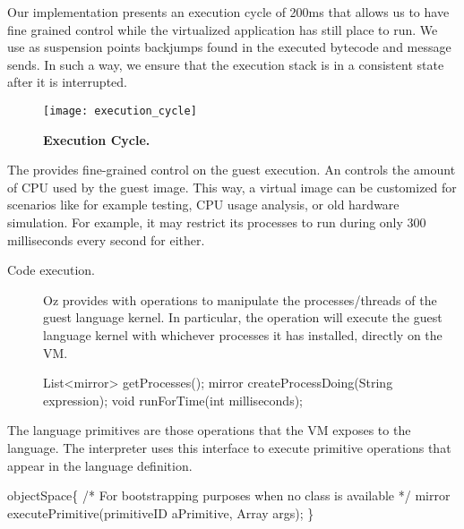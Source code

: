 Our implementation presents an execution cycle of 200ms that allows us to have fine grained control while the virtualized application has still place to run. We use as suspension points backjumps found in the executed bytecode and message sends. In such a way, we ensure that the execution stack is in a consistent state after it is interrupted.

\begin{figure}[ht]
\center
\texttt{[image: execution\_cycle]}
\caption{\textbf{Execution Cycle.} \label{fig:execution_cycle}}
\end{figure}

The \objectspace provides fine-grained control on the guest execution. An \objectspace controls the amount of CPU used by the guest image. This way, a virtual image can be customized for scenarios like for example testing, CPU usage analysis, or old hardware simulation. For example, it may restrict its processes to run during only 300 milliseconds every second for either.

\begin{description}
\item[Code execution.] Oz provides with operations to manipulate the processes/threads of the guest language kernel. In particular, the  operation will execute the guest language kernel with whichever processes it has installed, directly on the VM.
\begin{code}
List<mirror> getProcesses();
mirror createProcessDoing(String expression);
void runForTime(int milliseconds);
\end{code}
\end{description}

The language primitives are those operations that the VM exposes to the language. The interpreter uses this interface to execute primitive operations that appear in the language definition.

\begin{code}
objectSpace\{
    /* For bootstrapping purposes when no class is available */
    mirror executePrimitive(primitiveID aPrimitive, Array args); 
\}
\end{code}



